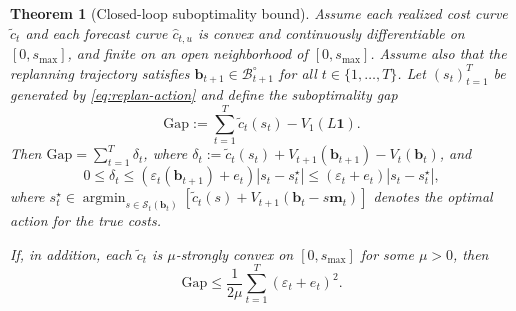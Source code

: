 \documentclass{uai2026} %
\newtheorem{theorem}{Theorem}[section]
\newcommand{\1}{\mathbf{1}}
\newcommand{\scalt}{\mathcal{S}_{t}}
\renewcommand{\epsilon}{\varepsilon}
\newcommand{\bcal}{\mathcal{B}}
\newcommand{\argmin}{\operatorname*{argmin}}
\begin{document}
\begin{theorem}[Closed-loop suboptimality bound]
  \label{thm:replan-regret}
  Assume each realized cost curve $\tilde{c}_t$ and each forecast curve $\hat{c}_{t,u}$ is convex and continuously differentiable on $[0,s_{\max}]$, and finite on an open neighborhood of $[0,s_{\max}]$.
  Assume also that the replanning trajectory satisfies $\mathbf{b}_{t+1}\in\bcal_{t+1}^{\circ}$ for all $t\in\{1,\dots,T\}$.
  Let $(s_t)_{t=1}^{T}$ be generated by \eqref{eq:replan-action} and define the suboptimality gap
  \begin{equation*}
    \mathrm{Gap} := \sum_{t=1}^{T} \tilde{c}_t(s_t) - V_1(L\1).
  \end{equation*}
  Then $\mathrm{Gap}=\sum_{t=1}^{T} \delta_t$, where $\delta_t:=\tilde{c}_t(s_t)+V_{t+1}(\mathbf{b}_{t+1})-V_t(\mathbf{b}_t)$, and
  \begin{equation*}
    0 \le \delta_t \le \left(\epsilon_t(\mathbf{b}_{t+1})+e_t\right)|s_t-s_t^{\star}|
    \le (\epsilon_t+e_t)|s_t-s_t^{\star}|,
  \end{equation*}
  where $s_t^{\star}\in\argmin_{s\in\scalt(\mathbf{b}_t)}[\tilde{c}_t(s)+V_{t+1}(\mathbf{b}_t-s\mathbf{m}_t)]$ denotes the optimal action for the true costs.

  If, in addition, each $\tilde{c}_t$ is $\mu$-strongly convex on $[0,s_{\max}]$ for some $\mu>0$, then
  \begin{equation*}
    \mathrm{Gap} \le \frac{1}{2\mu}\sum_{t=1}^{T} (\epsilon_t+e_t)^2.
  \end{equation*}
\end{theorem}
\end{document}
